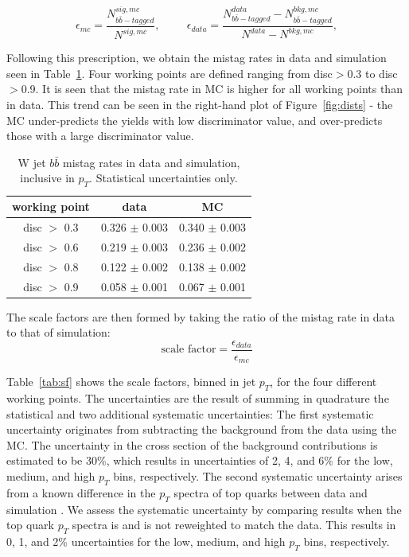 \begin{equation}
\label{eq:mistags}
\epsilon_{mc} = \frac{ N_{b\bar{b}-tagged}^{sig, mc} } { N^{sig, mc} }, \hspace{1cm}
\epsilon_{data} = \frac{N_{b\bar{b}-tagged}^{data}-N_{b\bar{b}-tagged}^{bkg, mc}}{N^{data} - N^{bkg, mc}}, 
\end{equation}

Following this prescription, we obtain the mistag rates in data and simulation seen in Table~\ref{tab:mistag}. Four working points are defined ranging from disc$>$0.3 to disc$>$0.9. It is seen that the mistag rate in MC is higher for all working points than in data. This trend can be seen in the right-hand plot of Figure~\ref{fig:dists} - the MC under-predicts the yields with low discriminator value, and over-predicts those with a large discriminator value.

\begin{table}[hbp!]
\centering
\caption[W jet $b\bar{b}$ mistag rates in data and simulation, inclusive in $p_{T}$]{W jet $b\bar{b}$ mistag rates in data and simulation, inclusive in $p_{T}$. Statistical uncertainties only.}
\label{tab:mistag}
\begin{tabular}{c|cc}
\hline\hline
working point & data & MC\\
\hline
disc $>$ 0.3 & 0.326 $\pm$ 0.003 & 0.340 $\pm$ 0.003 \\
disc $>$ 0.6 & 0.219 $\pm$ 0.003 & 0.236 $\pm$ 0.002 \\
disc $>$ 0.8 & 0.122 $\pm$ 0.002 & 0.138 $\pm$ 0.002 \\
disc $>$ 0.9 & 0.058 $\pm$ 0.001 & 0.067 $\pm$ 0.001 \\
\hline\hline
\end{tabular}
\end{table}

The scale factors are then formed by taking the ratio of the mistag rate in data to that of simulation:
\begin{equation}
\label{eq:sf}
\textrm{scale factor} = \frac{\epsilon_{data}} {\epsilon_{mc}}
\end{equation}

Table~\ref{tab:sf} shows the scale factors, binned in jet $p_{T}$, for the four different working points. The uncertainties are the result of summing in quadrature the statistical and two additional systematic uncertainties: The first systematic uncertainty originates from subtracting the background from the data using the MC. The uncertainty in the cross section of the background contributions is estimated to be 30\%, which results in uncertainties of 2, 4, and 6\% for the low, medium, and high $p_{T}$ bins, respectively.  The second systematic uncertainty arises from a known difference in the $p_{T}$ spectra of top quarks between data and simulation \cite{ttbar}. We assess the systematic uncertainty by comparing results when the top quark $p_{T}$ spectra is and is not reweighted to match the data.  This results in 0, 1, and 2\% uncertainties for the low, medium, and high $p_{T}$ bins, respectively.


